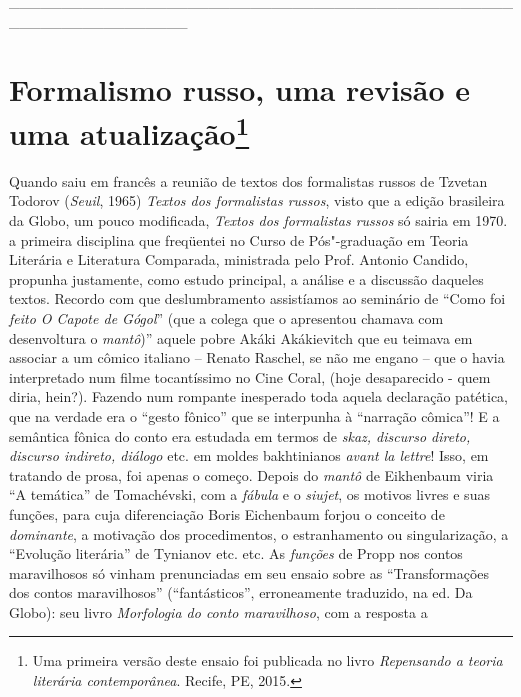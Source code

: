 \_\_\_\_\_\_\_\_\_\_\_\_\_\_\_\_\_\_\_\_\_\_\_\_\_\_\_\_\_\_\_\_\_\_\_\_\_\_\_\_\_\_\_\_\_\_\_\_\_\_\_\_\_\_\_\_\_\_\_\_\_\_\_\_\_

\chapter{Formalismo russo, uma revisão e uma atualização\footnote{Uma
  primeira versão deste ensaio foi publicada no livro \emph{Repensando a
  teoria literária contemporânea}. Recife, PE, 2015.}}

Quando saiu em francês a reunião de textos dos formalistas russos de
Tzvetan Todorov (\emph{Seuil}, 1965) \emph{Textos dos formalistas
russos}, visto que a edição brasileira da Globo, um pouco modificada,
\emph{Textos dos formalistas russos} só sairia em 1970. a primeira
disciplina que freqüentei no Curso de Pós"-graduação em Teoria Literária
e Literatura Comparada, ministrada pelo Prof. Antonio Candido, propunha
justamente, como estudo principal, a análise e a discussão daqueles
textos. Recordo com que deslumbramento assistíamos ao seminário de
``Como foi \emph{feito O Capote de Gógol}'' (que a colega que o
apresentou chamava com desenvoltura o \emph{mantô})'' aquele pobre Akáki
Akákievitch que eu teimava em associar a um cômico italiano -- Renato
Raschel, se não me engano -- que o havia interpretado num filme
tocantíssimo no Cine Coral, (hoje desaparecido - quem diria, hein?).
Fazendo num rompante inesperado toda aquela declaração patética, que na
verdade era o ``gesto fônico'' que se interpunha à ``narração cômica''!
E a semântica fônica do conto era estudada em termos de \emph{skaz,
discurso direto, discurso indireto, diálogo} etc. em moldes bakhtinianos
\emph{avant la lettre}! Isso, em tratando de prosa, foi apenas o começo.
Depois do \emph{mantô} de Eikhenbaum viria ``A temática'' de
Tomachévski, com a \emph{fábula} e o \emph{siujet}, os motivos livres e
suas funções, para cuja diferenciação Boris Eichenbaum forjou o conceito
de \emph{dominante}, a motivação dos procedimentos, o estranhamento ou
singularização, a ``Evolução literária'' de Tynianov etc. etc. As
\emph{funções} de Propp nos contos maravilhosos só vinham prenunciadas
em seu ensaio sobre as ``Transformações dos contos maravilhosos''
(``fantásticos'', erroneamente traduzido, na ed. Da Globo): seu livro
\emph{Morfologia do conto maravilhoso}, com a resposta a
